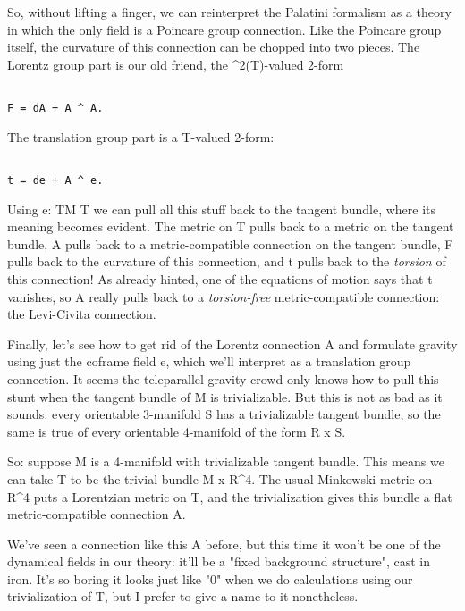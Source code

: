 So, without lifting a finger, we can reinterpret the Palatini formalism
as a theory in which the only field is a Poincare group connection. 
Like the Poincare group itself, the curvature of this connection can be
chopped into two pieces.  The Lorentz group part is our old friend, the
\Lambda ^{2}(T)-valued 2-form 


\begin{verbatim}

F = dA + A ^ A.
\end{verbatim}
    
The translation group part is a T-valued 2-form:


\begin{verbatim}

t = de + A ^ e.
\end{verbatim}
    
Using e: TM \to  T we can pull all this stuff back to the tangent bundle,
where its meaning becomes evident.  The metric on T pulls back to a
metric on the tangent bundle, A pulls back to a metric-compatible
connection on the tangent bundle, F pulls back to the curvature of this
connection, and t pulls back to the \emph{torsion} of this connection!   As 
already hinted, one of the equations of motion says that t vanishes, so
A really pulls back to a \emph{torsion-free} metric-compatible connection:
the Levi-Civita connection.

Finally, let's see how to get rid of the Lorentz connection A and
formulate gravity using just the coframe field e, which we'll interpret
as a translation group connection.  It seems the teleparallel gravity
crowd only knows how to pull this stunt when the tangent bundle of M is
trivializable.  But this is not as bad as it sounds: every orientable
3-manifold S has a trivializable tangent bundle, so the same is true of
every orientable 4-manifold of the form R x S.  

So: suppose M is a 4-manifold with trivializable tangent bundle.  This
means we can take T to be the trivial bundle M x R^{4}.  The usual
Minkowski metric on R^{4} puts a Lorentzian metric on T, and the
trivialization gives this bundle a flat metric-compatible connection A.

We've seen a connection like this A before, but this time it won't be
one of the dynamical fields in our theory: it'll be a "fixed background
structure", cast in iron.  It's so boring it looks just like "0" when we
do calculations using our trivialization of T, but I prefer to give a
name to it nonetheless.  

